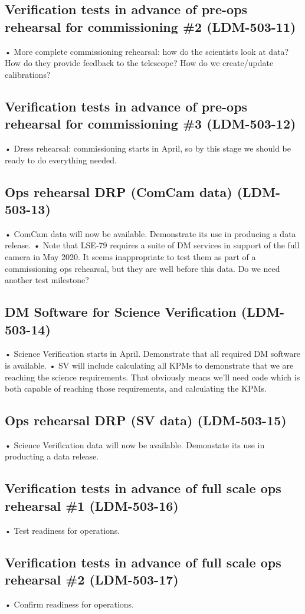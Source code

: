\subsection{Verification tests in advance of pre-ops rehearsal for commissioning \#2 \textbf{(LDM-503-11)}\label{LDM-503-11}}
• More complete commissioning rehearsal: how do the scientists look at data? How do they provide feedback to the telescope? How do we create/update calibrations?
 \newline
\subsection{Verification tests in advance of pre-ops rehearsal for commissioning \#3 \textbf{(LDM-503-12)}\label{LDM-503-12}}
• Dress rehearsal: commissioning starts in April, so by this stage we should be ready to do everything needed.
 \newline
\subsection{ Ops rehearsal DRP (ComCam data) \textbf{(LDM-503-13)}\label{LDM-503-13}}
• ComCam data will now be available. Demonstrate its use in producing a data release.
 \newline• Note that LSE-79 requires a suite of DM services in support of the full camera in May 2020. It seems inappropriate to test them as part of a commissioning ops rehearsal, but they are well before this data. Do we need another test milestone?
\subsection{ DM Software for Science Verification \textbf{(LDM-503-14)}\label{LDM-503-14}}
• Science Verification starts in April. Demonstrate that all required DM software is available.
 \newline• SV will include calculating all KPMs to demonstrate that we are reaching the science requirements. That obviously means we'll need code which is both capable of reaching those requirements, and calculating the KPMs.
\subsection{ Ops rehearsal DRP (SV data) \textbf{(LDM-503-15)}\label{LDM-503-15}}
• Science Verification data will now be available. Demonstate its use in producting a data release.
 \newline
\subsection{Verification tests in advance of full scale ops rehearsal \#1 \textbf{(LDM-503-16)}\label{LDM-503-16}}
• Test readiness for operations.
 \newline
\subsection{Verification tests in advance of full scale ops rehearsal \#2 \textbf{(LDM-503-17)}\label{LDM-503-17}}
• Confirm readiness for operations.
 \newline
